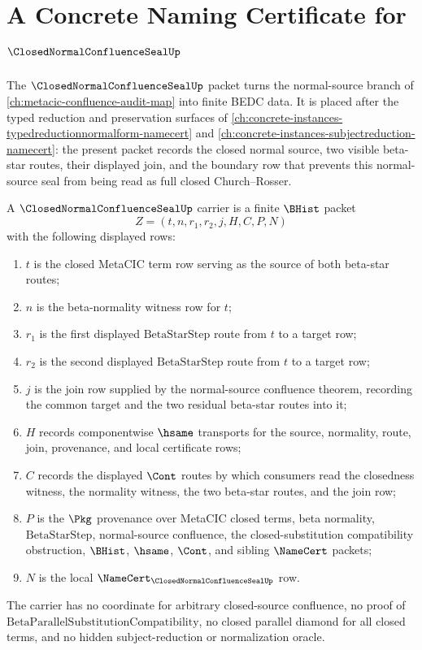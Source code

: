 \chapter{A Concrete Naming Certificate for $\ClosedNormalConfluenceSealUp$}
\label{ch:concrete-instances-closednormalconfluenceseal-namecert}

The $\ClosedNormalConfluenceSealUp$ packet turns the normal-source branch of
\autoref{ch:metacic-confluence-audit-map} into finite BEDC data. It is placed
after the typed reduction and preservation surfaces of
\autoref{ch:concrete-instances-typedreductionnormalform-namecert} and
\autoref{ch:concrete-instances-subjectreduction-namecert}: the present packet
records the closed normal source, two visible beta-star routes, their displayed
join, and the boundary row that prevents this normal-source seal from being
read as full closed Church--Rosser.

\begin{definition}
\label{def:closed-normal-confluence-seal-carrier}
A $\ClosedNormalConfluenceSealUp$ carrier is a finite $\BHist$ packet
$$
Z=(t,n,r_1,r_2,j,H,C,P,N)
$$
with the following displayed rows:
\begin{enumerate}
\item $t$ is the closed MetaCIC term row serving as the source of both
beta-star routes;
\item $n$ is the beta-normality witness row for $t$;
\item $r_1$ is the first displayed $\mathrm{BetaStarStep}$ route from $t$ to a
target row;
\item $r_2$ is the second displayed $\mathrm{BetaStarStep}$ route from $t$ to a
target row;
\item $j$ is the join row supplied by the normal-source confluence theorem,
recording the common target and the two residual beta-star routes into it;
\item $H$ records componentwise $\hsame$ transports for the source,
normality, route, join, provenance, and local certificate rows;
\item $C$ records the displayed $\Cont$ routes by which consumers read the
closedness witness, the normality witness, the two beta-star routes, and the
join row;
\item $P$ is the $\Pkg$ provenance over MetaCIC closed terms, beta normality,
$\mathrm{BetaStarStep}$, normal-source confluence, the closed-substitution
compatibility obstruction, $\BHist$, $\hsame$, $\Cont$, and sibling
$\NameCert$ packets;
\item $N$ is the local $\NameCert_{\ClosedNormalConfluenceSealUp}$ row.
\end{enumerate}
The carrier has no coordinate for arbitrary closed-source confluence, no proof
of $\mathrm{BetaParallelSubstitutionCompatibility}$, no closed parallel diamond
for all closed terms, and no hidden subject-reduction or normalization oracle.
\end{definition}


